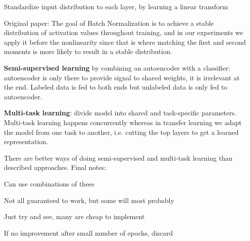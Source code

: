 \documentclass[12pt]{article}
\begin{document}
\item Standardize input distribution to each layer, by learning a linear transform
\item Original paper: The goal of Batch Normalization is to achieve a stable distribution of activation values throughout training, and in our experiments we apply it before the nonlinearity since that is where matching the first and second moments is more likely to result in a stable distribution.
\ule
\par \textbf{Semi-supervised learning} by combining an autoencoder with a classifier: autoencoder is only there to provide signal to shared weights, it is irrelevant at the end. Labeled data is fed to both ends but unlabeled data is only fed to autoencoder.
\par\textbf{Multi-task learning}: divide model into shared and task-specific parameters. Multi-task learning happens concurrently whereas in transfer learning we adapt the model from one task to another, i.e. cutting the top layers to get a learned representation.
\par There are better ways of doing semi-supervised and multi-task learning than described approaches.
Final notes:
\ulb
\item Can use combinations of these
\item Not all guaranteed to work, but some will most probably
\item Just try and see, many are cheap to implement
\item If no improvement after small number of epochs, discard
\ule
\end{document}
